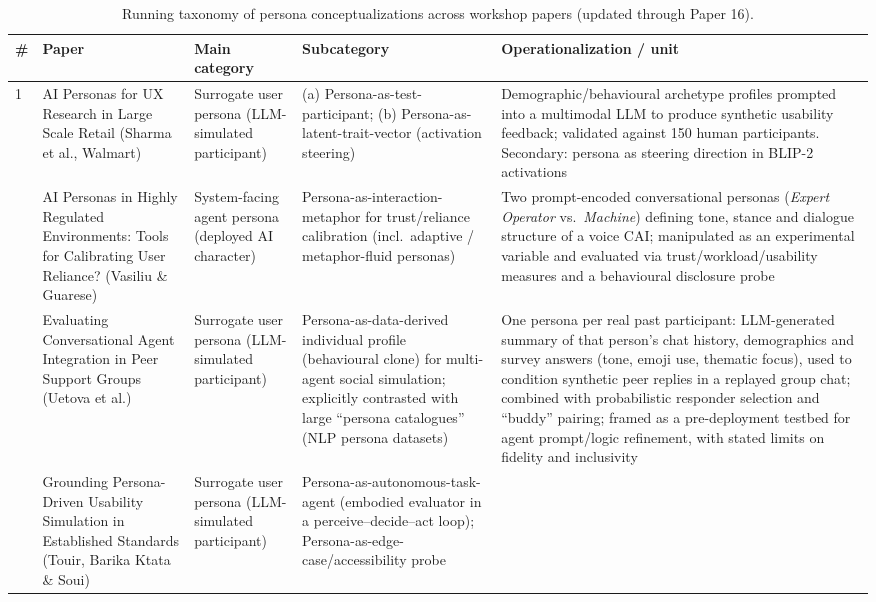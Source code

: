 \begin{table}[t]
\centering
\caption{Running taxonomy of persona conceptualizations across workshop papers (updated through Paper 16).}
\label{tab:persona-taxonomy}
\small
\begin{tabular}{p{0.5cm} p{3.6cm} p{3.4cm} p{3.6cm} p{3.6cm}}
\toprule
\textbf{\#} & \textbf{Paper} & \textbf{Main category} & \textbf{Subcategory} & \textbf{Operationalization / unit} \\
\midrule
1 & AI Personas for UX Research in Large Scale Retail (Sharma et al., Walmart) &
Surrogate user persona (LLM-simulated participant) &
(a) Persona-as-test-participant; (b) Persona-as-latent-trait-vector (activation steering) &
Demographic/behavioural archetype profiles prompted into a multimodal LLM to produce synthetic usability feedback; validated against 150 human participants. Secondary: persona as steering direction in BLIP-2 activations \\
\addlinespace
2 & AI Personas in Highly Regulated Environments: Tools for Calibrating User Reliance? (Vasiliu \& Guarese) &
System-facing agent persona (deployed AI character) &
Persona-as-interaction-metaphor for trust/reliance calibration (incl.\ adaptive / metaphor-fluid personas) &
Two prompt-encoded conversational personas (\textit{Expert Operator} vs.\ \textit{Machine}) defining tone, stance and dialogue structure of a voice CAI; manipulated as an experimental variable and evaluated via trust/workload/usability measures and a behavioural disclosure probe \\
\addlinespace
3 & Evaluating Conversational Agent Integration in Peer Support Groups (Uetova et al.) &
Surrogate user persona (LLM-simulated participant) &
Persona-as-data-derived individual profile (behavioural clone) for multi-agent social simulation; explicitly contrasted with large ``persona catalogues'' (NLP persona datasets) &
One persona per real past participant: LLM-generated summary of that person's chat history, demographics and survey answers (tone, emoji use, thematic focus), used to condition synthetic peer replies in a replayed group chat; combined with probabilistic responder selection and ``buddy'' pairing; framed as a pre-deployment testbed for agent prompt/logic refinement, with stated limits on fidelity and inclusivity \\
\addlinespace
4 & Grounding Persona-Driven Usability Simulation in Established Standards (Touir, Barika Ktata \& Soui) &
Surrogate user persona (LLM-simulated participant) &
Persona-as-autonomous-task-agent (embodied evaluator in a perceive--decide--act loop); Persona-as-edge-case/accessibility probe &

\end{tabular}
\end{table}
